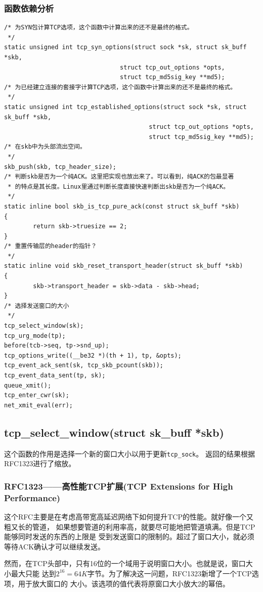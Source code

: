 \documentclass[11pt, a4paper,oneside]{book}
\theoremstyle{ocrenumbox}
\theoremstyle{purplenumbox}
\theoremstyle{blackbox}
\begin{document}
\subsubsection{函数依赖分析}

\begin{verbatim}
/* 为SYN包计算TCP选项，这个函数中计算出来的还不是最终的格式。
 */
static unsigned int tcp_syn_options(struct sock *sk, struct sk_buff *skb,
                                struct tcp_out_options *opts,
                                struct tcp_md5sig_key **md5);
/* 为已经建立连接的套接字计算TCP选项，这个函数中计算出来的还不是最终的格式。
 */
static unsigned int tcp_established_options(struct sock *sk, struct sk_buff *skb,
                                        struct tcp_out_options *opts,
                                        struct tcp_md5sig_key **md5);
/* 在skb中为头部流出空间。
 */
skb_push(skb, tcp_header_size);
/* 判断skb是否为一个纯ACK。这里把实现也放出来了。可以看到，纯ACK的包最显著
 * 的特点是其长度。Linux里通过判断长度直接快速判断出skb是否为一个纯ACK。
 */
static inline bool skb_is_tcp_pure_ack(const struct sk_buff *skb)
{
        return skb->truesize == 2;
}
/* 重置传输层的header的指针？
 */
static inline void skb_reset_transport_header(struct sk_buff *skb)
{
        skb->transport_header = skb->data - skb->head;
}
/* 选择发送窗口的大小
 */
tcp_select_window(sk);
tcp_urg_mode(tp);
before(tcb->seq, tp->snd_up);
tcp_options_write((__be32 *)(th + 1), tp, &opts);
tcp_event_ack_sent(sk, tcp_skb_pcount(skb));
tcp_event_data_sent(tp, sk);
queue_xmit();
tcp_enter_cwr(sk);
net_xmit_eval(err);
\end{verbatim}

\subsection{tcp\_select\_window(struct sk\_buff *skb)}
这个函数的作用是选择一个新的窗口大小以用于更新\texttt{tcp_sock}。
返回的结果根据RFC1323进行了缩放。

\subsubsection{RFC1323——高性能TCP扩展(TCP Extensions for High Performance)}
这个RFC主要是在考虑高带宽高延迟网络下如何提升TCP的性能。就好像一个又粗又长的管道，
如果想要管道的利用率高，就要尽可能地把管道填满。但是TCP能够同时发送的东西的上限是
受到发送窗口的限制的。超过了窗口大小，就必须等待ACK确认才可以继续发送。

然而，在TCP头部中，只有16位的一个域用于说明窗口大小。也就是说，窗口大小最大只能
达到$2^{16}=64K字节$。为了解决这一问题，RFC1323新增了一个TCP选项，用于放大窗口的
大小。该选项的值代表将原窗口大小放大2的幂倍。
\end{document}
